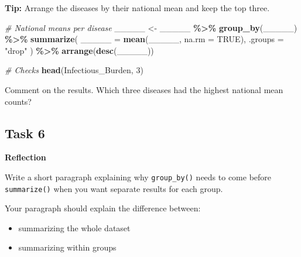 \documentclass[
]{article}
\newenvironment{Shaded}{\begin{snugshade}}{\end{snugshade}}
\newcommand{\AttributeTok}[1]{\textcolor[rgb]{0.13,0.29,0.53}{#1}}
\newcommand{\CommentTok}[1]{\textcolor[rgb]{0.56,0.35,0.01}{\textit{#1}}}
\newcommand{\ConstantTok}[1]{\textcolor[rgb]{0.56,0.35,0.01}{#1}}
\newcommand{\DecValTok}[1]{\textcolor[rgb]{0.00,0.00,0.81}{#1}}
\newcommand{\FunctionTok}[1]{\textcolor[rgb]{0.13,0.29,0.53}{\textbf{#1}}}
\newcommand{\NormalTok}[1]{#1}
\newcommand{\OtherTok}[1]{\textcolor[rgb]{0.56,0.35,0.01}{#1}}
\newcommand{\SpecialCharTok}[1]{\textcolor[rgb]{0.81,0.36,0.00}{\textbf{#1}}}
\newcommand{\StringTok}[1]{\textcolor[rgb]{0.31,0.60,0.02}{#1}}
\begin{document}
\textbf{Tip:} Arrange the diseases by their national mean and keep the
top three.

\begin{Shaded}
\begin{Highlighting}[]
\CommentTok{\# National means per disease}
\NormalTok{\_\_\_\_\_ }\OtherTok{\textless{}{-}}\NormalTok{ \_\_\_\_\_ }\SpecialCharTok{\%\textgreater{}\%}
  \FunctionTok{group\_by}\NormalTok{(\_\_\_\_\_) }\SpecialCharTok{\%\textgreater{}\%}
  \FunctionTok{summarize}\NormalTok{(}
    \AttributeTok{\_\_\_\_\_ =} \FunctionTok{mean}\NormalTok{(\_\_\_\_\_, }\AttributeTok{na.rm =} \ConstantTok{TRUE}\NormalTok{),}
    \AttributeTok{.groups =} \StringTok{"drop"}
\NormalTok{  ) }\SpecialCharTok{\%\textgreater{}\%}
  \FunctionTok{arrange}\NormalTok{(}\FunctionTok{desc}\NormalTok{(\_\_\_\_\_))}
\end{Highlighting}
\end{Shaded}

\begin{Shaded}
\begin{Highlighting}[]
\CommentTok{\#  Checks}
\FunctionTok{head}\NormalTok{(Infectious\_Burden, }\DecValTok{3}\NormalTok{)}
\end{Highlighting}
\end{Shaded}

Comment on the results. Which three diseases had the highest national
mean counts?

\subsection{Task 6}\label{task-6}

\textbf{Reflection}

Write a short paragraph explaining why \texttt{group\_by()} needs to
come before \texttt{summarize()} when you want separate results for each
group.

Your paragraph should explain the difference between:

\begin{itemize}
\item
  summarizing the whole dataset
\item
  summarizing within groups
\end{itemize}
\end{document}
